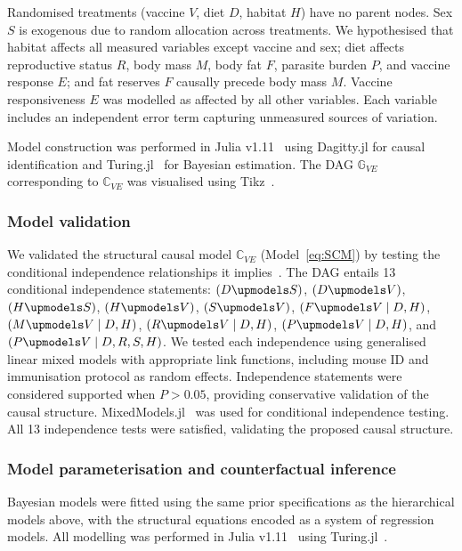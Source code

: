 \documentclass[a4paper, hidelinks, 11pt]{article}
\begin{document}
Randomised treatments (vaccine $V$, diet $D$, habitat $H$) have no parent nodes. Sex $S$ is exogenous due to random allocation across treatments. We hypothesised that habitat affects all measured variables except vaccine and sex; diet affects reproductive status $R$, body mass $M$, body fat $F$, parasite burden $P$, and vaccine response $E$; and fat reserves $F$ causally precede body mass $M$. Vaccine responsiveness $E$ was modelled as affected by all other variables. Each variable includes an independent error term capturing unmeasured sources of variation.

Model construction was performed in Julia v1.11~\cite{Bezanson2017} using Dagitty.jl for causal identification and Turing.jl~\cite{ge2018t} for Bayesian estimation. The DAG $\mathbb{G}_{VE}$ corresponding to $\mathbb{C}_{VE}$ was visualised using Tikz~\cite{Tan12}.

\subsubsection{Model validation}\label{sec:structure}

We validated the structural causal model $\mathbb{C}_{VE}$ (Model~\ref{eq:SCM}) by testing the conditional independence relationships it implies~\cite{Pearl2009b,Cinelli2021}. The DAG entails 13 conditional independence statements: $(D \upmodels S)$, $(D \upmodels V)$, $(H \upmodels S)$, $(H \upmodels V)$, $(S \upmodels V)$, $(F \upmodels V \mid D, H)$, $(M \upmodels V \mid D, H)$, $(R \upmodels V \mid D, H)$, $(P \upmodels V \mid D, H)$, and $(P \upmodels V \mid D, R, S, H)$. We tested each independence using generalised linear mixed models with appropriate link functions, including mouse ID and immunisation protocol as random effects. Independence statements were considered supported when $P > 0.05$, providing conservative validation of the causal structure. MixedModels.jl~\cite{douglas_bates_2022} was used for conditional independence testing. All 13 independence tests were satisfied, validating the proposed causal structure.

\subsubsection{Model parameterisation and counterfactual inference}\label{sec:parameterisation}

Bayesian models were fitted using the same prior specifications as the hierarchical models above, with the structural equations encoded as a system of regression models. All modelling was performed in Julia v1.11~\cite{Bezanson2017} using Turing.jl~\cite{ge2018t}.
\end{document}
